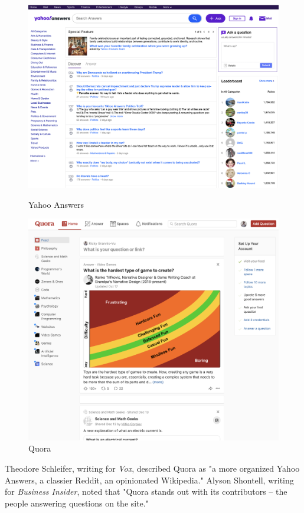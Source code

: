 \documentclass[class=book, crop=false]{standalone}
\begin{document}
\begin{figure}[!tbp]
  \centering
  \begin{minipage}[b]{0.4\textwidth}
    \includegraphics[width=\textwidth]{yahooanswers}
    \caption{Yahoo Answers}
  \end{minipage}
  \begin{minipage}[b]{0.4\textwidth}
    \includegraphics[width=\textwidth]{quora}
    \caption{Quora}
  \end{minipage}
\end{figure}

Theodore Schleifer, writing for \textit{Vox}, described Quora as "a more organized Yahoo Answers, a classier Reddit, an opinionated Wikipedia." Alyson Shontell, writing for \textit{Business Insider}, noted that "Quora stands out with its contributors -- the people answering questions on the site."
\end{document}
